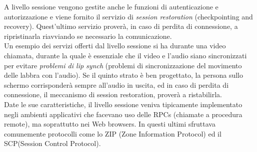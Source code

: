 \documentclass[a4paper, 11pt, oneside]{book}
\theoremstyle{plain}
\begin{document}
A livello sessione vengono gestite anche le funzioni di autenticazione e autorizzazione e viene fornito il servizio di \textit{session restoration} (checkpointing and recovery). Quest'ultimo servizio proverà, in caso di perdita di connessione, a ripristinarla riavviando se necessario la comunicazione.\\ Un esempio dei servizi offerti dal livello sessione si ha durante una video chiamata, durante la quale è essenziale che il video e l'audio siano sincronizzati per evitare \textit{problemi di lip synch} (problemi di sincronizzazione del movimento delle labbra con l'audio). Se il quinto strato è ben progettato, la persona sullo schermo corrisponderà sempre all'audio in uscita, ed in caso di perdita di connessione, il meccanismo di session restoration, proverà a ristabilirla. \\Date le sue caratteristiche, il livello sessione veniva tipicamente implementato negli ambienti applicativi che facevano uso delle RPCs (chiamate a procedura remote), ma soprattutto nei Web browsers. In questi ultimi sfruttava comunemente protocolli come lo ZIP (Zone Information Protocol) ed il SCP(Session Control Protocol).
\end{document}
